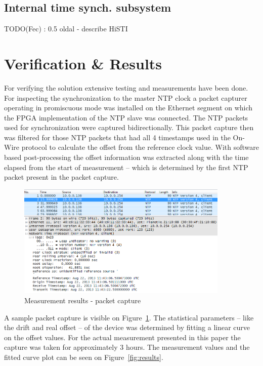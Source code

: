 \documentclass[article]{IEEEtran}
\begin{document}
\subsection{Internal time synch. subsystem}
TODO(Fec) : 0.5 oldal
- describe HiSTI

\section{Verification \& Results}


For verifying the solution extensive testing and measurements have been done. For inspecting the synchronization 
to the master NTP clock a packet capturer operating in promiscuous mode was installed on the Ethernet segment on which the FPGA implementation
of the NTP slave was connected. The NTP packets used for synchronization were captured bidirectionally. This packet
capture then was filtered for those NTP packets that had all 4 timestamps used in the On-Wire protocol to calculate the 
offset from the reference clock value. With software based post-processing the offset information was extracted along with the time elapsed from 
the start of measurement -- which is determined by the first NTP packet present in the packet capture.

\begin{figure}[!htb]
    \centering
    \includegraphics[width=0.9\textwidth]{figures_raw/pcap-NTP.png}
    \caption{Measurement results - packet capture}
    \label{fig:pcap-NTP}
\end{figure}



A sample packet capture is visible on Figure~\ref{fig:pcap-NTP}. The statistical parameters -- like the drift and real offset -- of the device was determined by
fitting a linear curve on the offset values. For the actual measurement presented in this paper the capture was taken for approximately 3 hours. 
The measurement values and the fitted curve plot can be seen on Figure~\ref{fig:results}.
\end{document}
